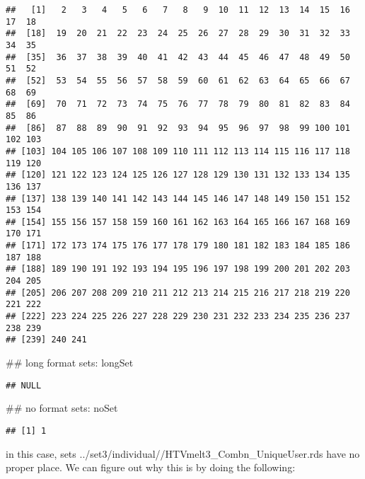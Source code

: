 \documentclass[10pt]{report}
\newenvironment{Shaded}{}{}
\newcommand{\KeywordTok}[1]{\textcolor[rgb]{0.00,0.44,0.13}{\textbf{{#1}}}}
\newcommand{\DecValTok}[1]{\textcolor[rgb]{0.25,0.63,0.44}{{#1}}}
\newcommand{\StringTok}[1]{\textcolor[rgb]{0.25,0.44,0.63}{{#1}}}
\newcommand{\NormalTok}[1]{{#1}}
\begin{document}
\begin{verbatim}
##   [1]   2   3   4   5   6   7   8   9  10  11  12  13  14  15  16  17  18
##  [18]  19  20  21  22  23  24  25  26  27  28  29  30  31  32  33  34  35
##  [35]  36  37  38  39  40  41  42  43  44  45  46  47  48  49  50  51  52
##  [52]  53  54  55  56  57  58  59  60  61  62  63  64  65  66  67  68  69
##  [69]  70  71  72  73  74  75  76  77  78  79  80  81  82  83  84  85  86
##  [86]  87  88  89  90  91  92  93  94  95  96  97  98  99 100 101 102 103
## [103] 104 105 106 107 108 109 110 111 112 113 114 115 116 117 118 119 120
## [120] 121 122 123 124 125 126 127 128 129 130 131 132 133 134 135 136 137
## [137] 138 139 140 141 142 143 144 145 146 147 148 149 150 151 152 153 154
## [154] 155 156 157 158 159 160 161 162 163 164 165 166 167 168 169 170 171
## [171] 172 173 174 175 176 177 178 179 180 181 182 183 184 185 186 187 188
## [188] 189 190 191 192 193 194 195 196 197 198 199 200 201 202 203 204 205
## [205] 206 207 208 209 210 211 212 213 214 215 216 217 218 219 220 221 222
## [222] 223 224 225 226 227 228 229 230 231 232 233 234 235 236 237 238 239
## [239] 240 241
\end{verbatim}

\begin{Shaded}
\begin{Highlighting}[]
\NormalTok{## long format sets:}
\NormalTok{longSet}
\end{Highlighting}
\end{Shaded}

\begin{verbatim}
## NULL
\end{verbatim}

\begin{Shaded}
\begin{Highlighting}[]
\NormalTok{## no format sets:}
\NormalTok{noSet}
\end{Highlighting}
\end{Shaded}

\begin{verbatim}
## [1] 1
\end{verbatim}

in this case, sets ../set3/individual//HTVmelt3\_Combn\_UniqueUser.rds
have no proper place. We can figure out why this is by doing the
following:

\begin{Shaded}
\end{Shaded}
\end{document}
